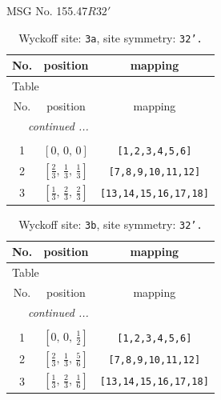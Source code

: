\documentclass[fleqn,8pt]{jsarticle}
\begin{document}
\setcounter{MaxMatrixCols}{32}

\renewcommand{\tablename}{Table~}
\renewcommand{\figurename}{Figure~}
\begin{center}
\LARGE
MSG No. 155.47\quad$R32'$
\end{center}
\renewcommand{\arraystretch}{1.2}
\begin{longtable}{ccc}
\caption{Wyckoff site: {\tt 3a}, site symmetry: {\tt 32'.}}
 \\
 \hline \hline
No. & position & mapping \\ \hline \endfirsthead

\multicolumn{2}{l}{\tablename\ \thetable{}} \\
 \hline \hline
No. & position & mapping \\ \hline \endhead

 \hline \hline
\multicolumn{2}{r}{\footnotesize\it continued ...} \\ \endfoot

 \hline \hline
\multicolumn{2}{r}{} \\ \endlastfoot

1 & $\left[ 0,\, 0,\, 0 \right]$ & {\tt [1,2,3,4,5,6]} \\ \hline
2 & $\left[ \frac{2}{3},\, \frac{1}{3},\, \frac{1}{3} \right]$ & {\tt [7,8,9,10,11,12]} \\ \hline
3 & $\left[ \frac{1}{3},\, \frac{2}{3},\, \frac{2}{3} \right]$ & {\tt [13,14,15,16,17,18]} \\
\end{longtable}
\renewcommand{\arraystretch}{1.2}
\begin{longtable}{ccc}
\caption{Wyckoff site: {\tt 3b}, site symmetry: {\tt 32'.}}
 \\
 \hline \hline
No. & position & mapping \\ \hline \endfirsthead

\multicolumn{2}{l}{\tablename\ \thetable{}} \\
 \hline \hline
No. & position & mapping \\ \hline \endhead

 \hline \hline
\multicolumn{2}{r}{\footnotesize\it continued ...} \\ \endfoot

 \hline \hline
\multicolumn{2}{r}{} \\ \endlastfoot

1 & $\left[ 0,\, 0,\, \frac{1}{2} \right]$ & {\tt [1,2,3,4,5,6]} \\ \hline
2 & $\left[ \frac{2}{3},\, \frac{1}{3},\, \frac{5}{6} \right]$ & {\tt [7,8,9,10,11,12]} \\ \hline
3 & $\left[ \frac{1}{3},\, \frac{2}{3},\, \frac{1}{6} \right]$ & {\tt [13,14,15,16,17,18]} \\
\end{longtable}
\end{document}
